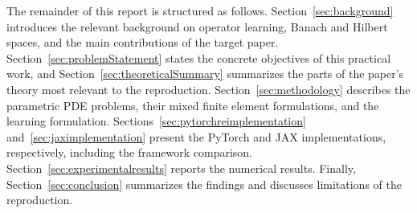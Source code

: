 The remainder of this report is structured as follows.
Section~\ref{sec:background} introduces the relevant background on operator learning, Banach and Hilbert spaces, and the main contributions of the target paper. Section~\ref{sec:problemStatement} states the concrete objectives of this practical work, and Section~\ref{sec:theoreticalSummary} summarizes the parts of the paper's theory most relevant to the reproduction. Section~\ref{sec:methodology} describes the parametric PDE problems, their mixed finite element formulations, and the learning formulation. Sections~\ref{sec:pytorchreimplementation} and~\ref{sec:jaximplementation} present the PyTorch and JAX implementations, respectively, including the framework comparison. Section~\ref{sec:experimentalresults} reports the numerical
results. Finally, Section~\ref{sec:conclusion} summarizes the findings and
discusses limitations of the reproduction.
